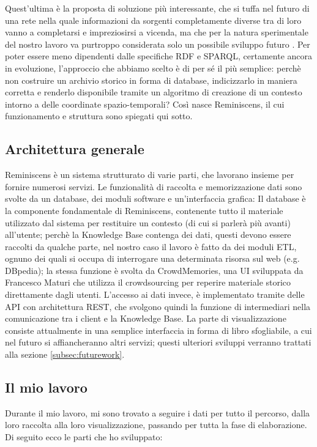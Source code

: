 \documentclass[sigproc-sp.tex]{subfiles}
\begin{document}
Quest’ultima è la proposta di soluzione più interessante, che si tuffa nel futuro di una rete nella quale informazioni da sorgenti completamente diverse tra di loro vanno a completarsi e impreziosirsi a vicenda, ma che per la natura sperimentale del nostro lavoro va purtroppo considerata solo un possibile sviluppo futuro .
Per poter essere meno dipendenti dalle specifiche RDF e SPARQL, certamente ancora in evoluzione, l’approccio che abbiamo scelto è di per sé il più semplice: perchè non costruire un archivio storico in forma di database, indicizzarlo in maniera corretta e renderlo disponibile tramite un algoritmo di creazione di un contesto intorno a delle coordinate spazio-temporali? Così nasce Reminiscens, il cui funzionamento e struttura sono spiegati qui sotto.

\subsection{Architettura generale}
Reminiscens è un sistema strutturato di varie parti, che lavorano insieme per fornire numerosi servizi. Le funzionalità di raccolta e memorizzazione dati sono svolte da un database, dei moduli software e un’interfaccia grafica: Il database è la componente fondamentale di Reminiscens, contenente tutto il materiale utilizzato dal sistema per restituire un contesto (di cui si parlerà più avanti) all’utente; perchè la Knowledge Base contenga dei dati, questi devono essere raccolti da qualche parte, nel nostro caso il lavoro è fatto da dei moduli ETL, ognuno dei quali si occupa di interrogare una determinata risorsa sul web (e.g. DBpedia); la stessa funzione è svolta da CrowdMemories, una UI sviluppata da Francesco Maturi che utilizza il crowdsourcing per reperire materiale storico direttamente dagli utenti. L’accesso ai dati invece, è implementato tramite delle API con architettura REST, che svolgono quindi la funzione di intermediari nella comunicazione tra i client e la Knowledge Base. La parte di visualizzazione consiste attualmente in una semplice interfaccia in forma di libro sfogliabile, a cui nel futuro si affiancheranno altri servizi; questi ulteriori sviluppi verranno trattati alla sezione \ref{subsec:futurework}.

\subsection{Il mio lavoro}
Durante il mio lavoro, mi sono trovato a seguire i dati per tutto il percorso, dalla loro raccolta alla loro visualizzazione, passando per tutta la fase di elaborazione. Di seguito ecco le parti che ho sviluppato:
\end{document}

